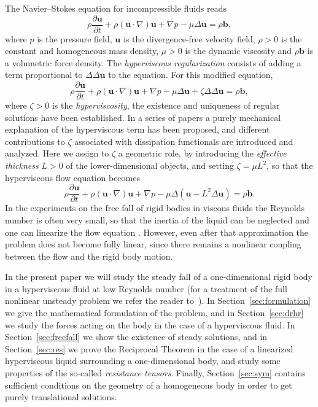 \documentclass[final]{amsart}
\theoremstyle{definition}
\theoremstyle{definition}
\theoremstyle{remark}
\begin{document}
The Navier--Stokes equation for incompressible fluids reads
\begin{equation*}
\rho\frac{{\partial}{\boldsymbol u}}{{\partial} t}+\rho({\boldsymbol u}\cdot\nabla){\boldsymbol u}+\nabla p-\mu{\Delta}{\boldsymbol u}=\rho{\boldsymbol b},
\end{equation*}
where $p$ is the pressure field, ${\boldsymbol u}$ is the divergence-free
velocity field, $\rho>0$ is the constant and homogeneous mass density,
$\mu>0$ is the dynamic viscosity and $\rho{\boldsymbol b}$ is a volumetric force
density. The {\em hyperviscous regularization} consists of adding a
term proportional to ${\Delta}{\Delta}{\boldsymbol u}$ to the equation. For this
modified equation,
\begin{equation*}
\rho\frac{{\partial}{\boldsymbol u}}{{\partial} t}+\rho({\boldsymbol u}\cdot\nabla){\boldsymbol u}+\nabla p-\mu{\Delta}{\boldsymbol u}
+\zeta{\Delta}{\Delta}{\boldsymbol u}=\rho{\boldsymbol b},
\end{equation*}
where $\zeta>0$ is the {\em hyperviscosity}, the existence and uniqueness of
regular solutions have been established. In a series of papers
\cite{FriGur06,Mus09,GiuMar11,Giu13} a purely mechanical explanation
of the hyperviscous term has been proposed, and different
contributions to $\zeta$ associated with dissipation functionals are
introduced and analyzed.  Here we assign to $\zeta$ a geometric role, by
introducing the \emph{effective thickness} $L>0$ of the
lower-dimensional objects, and setting $\zeta=\mu L^2$, so that the
hyperviscous flow equation becomes
\begin{equation*}
\rho\frac{{\partial}{\boldsymbol u}}{{\partial} t}+\rho({\boldsymbol u}\cdot\nabla){\boldsymbol u}+\nabla p-\mu{\Delta}\left({\boldsymbol u}
-L^2{\Delta}{\boldsymbol u}\right)=\rho{\boldsymbol b}.
\end{equation*}
In the experiments on the free fall of rigid bodies in viscous fluids
the Reynolds number is often very small, so that the inertia of the
liquid can be neglected and one can linearize the flow equation
\cite{Wei72,Bre64}. However, even after that approximation the problem
does not become fully linear, since there remains a nonlinear coupling
between the flow and the rigid body motion.

In the present paper we will study the steady fall of a one-dimensional
rigid body in a hyperviscous fluid at low Reynolds number (for a
treatment of the full nonlinear unsteady problem we refer the reader
to~\cite{GiuMar13}). In Section~\ref{sec:formulation} we give the
mathematical formulation of the problem, and in Section~\ref{sec:drhr}
we study the forces acting on the body in the case of a hyperviscous
fluid. In Section~\ref{sec:freefall} we show the existence of steady
solutions, and in Section~\ref{sec:res} we prove the Reciprocal
Theorem in the case of a linearized hyperviscous liquid surrounding a
one-dimensional body, and study some properties of the so-called {\em
  resistance tensors}. Finally, Section~\ref{sec:sym} contains
sufficient conditions on the geometry of a homogeneous body in order
to get purely translational solutions.
\end{document}
